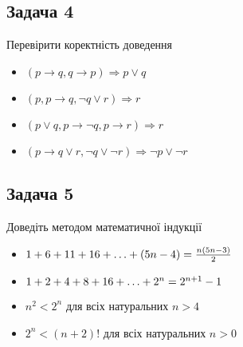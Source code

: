 \documentclass{article}
\begin{document}
\subsection*{Задача 4}
Перевірити коректність доведення
\begin{itemize}
    \item $(p \rightarrow q, q \rightarrow p) \Rightarrow p \lor q $
    \item $(p, p \rightarrow q, \lnot q \lor r) \Rightarrow r$
    \item $(p \lor q, p \rightarrow \lnot q, p \rightarrow r) \Rightarrow r$
    \item $(p \rightarrow q \lor r, \lnot q \lor \lnot r) \Rightarrow \lnot p \lor \lnot r$
\end{itemize}

\subsection*{Задача 5}
Доведіть методом математичної індукції
\begin{itemize}
    \item $1 + 6 + 11 + 16 + \mathellipsis + (5n-4) = \frac{n(5n-3)}{2}$
    \item $1 + 2 + 4 + 8 + 16 + \mathellipsis + 2^n = 2^{n+1} - 1$
    \item $n^2 < 2^n$ для всіх натуральних $n > 4$
    \item $2^n < (n+2)!$ для всіх натуральних $n > 0$
\end{itemize}
\end{document}
